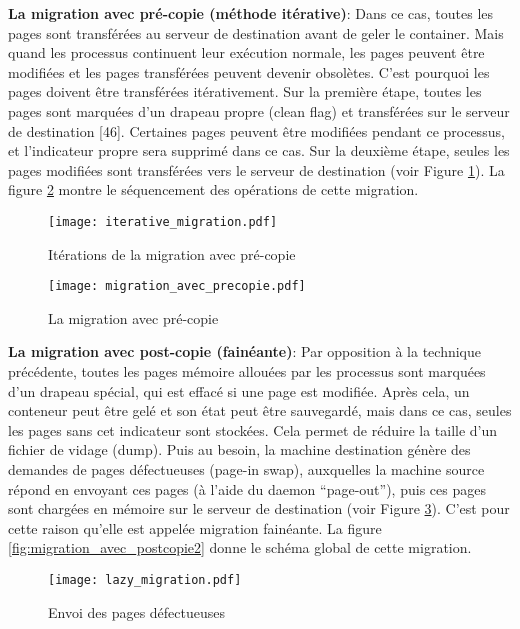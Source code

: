 \textbf{La migration avec pré-copie (méthode itérative)}: Dans ce cas, toutes les pages sont transférées au serveur de destination avant de geler le container. Mais quand les processus continuent leur exécution normale, les pages peuvent être modifiées et les pages transférées peuvent devenir obsolètes. C'est pourquoi les pages doivent être transférées itérativement. Sur la première étape, toutes les pages sont marquées d'un drapeau propre (clean flag) et transférées sur le serveur de destination [46]. Certaines pages peuvent être modifiées pendant ce processus, et l'indicateur propre sera supprimé dans ce cas. Sur la deuxième étape, seules les pages modifiées sont transférées vers le serveur de destination (voir Figure \ref{fig:migration_avec_precopie1}). La figure \ref{fig:migration_avec_precopie2} montre le séquencement des opérations de cette migration.\par
\begin{figure}[H]
\centering
\texttt{[image: iterative\_migration.pdf]}
\caption{Itérations de la migration avec pré-copie \cite{mirkin2008}}
\label{fig:migration_avec_precopie1}
\end{figure}
\begin{figure}[H]
\centering
\texttt{[image: migration\_avec\_precopie.pdf]}
\caption{La migration avec pré-copie \cite{puliafito2019}}
\label{fig:migration_avec_precopie2}
\end{figure}
\textbf{La migration avec post-copie (fainéante)}: Par opposition à la technique précédente, toutes les pages mémoire allouées par les processus sont marquées d'un drapeau spécial, qui est effacé si une page est modifiée. Après cela, un conteneur peut être gelé et son état peut être sauvegardé, mais dans ce cas, seules les pages sans cet indicateur sont stockées. Cela permet de réduire la taille d'un fichier de vidage (dump). Puis au besoin, la machine destination génère des demandes de pages défectueuses (page-in swap), auxquelles la machine source répond en envoyant ces pages (à l'aide du daemon “page-out”), puis ces pages sont chargées en mémoire sur le serveur de destination (voir Figure \ref{fig:migration_avec_postcopie1}). C'est pour cette raison qu'elle est appelée migration fainéante. La figure \ref{fig:migration_avec_postcopie2} donne le schéma global de cette migration.\par
\begin{figure}[H]
\centering
\texttt{[image: lazy\_migration.pdf]}
\caption{Envoi des pages défectueuses \cite{mirkin2008}}
\label{fig:migration_avec_postcopie1}
\end{figure}
